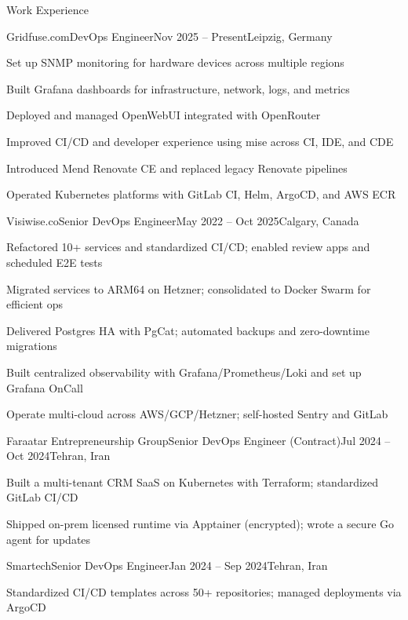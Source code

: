 \documentclass[]{main}
\begin{document}
\begin{section}{Work Experience}
  \begin{subsection}{Gridfuse.com}{DevOps Engineer}{Nov 2025 -- Present}{Leipzig, Germany}
     \item Set up SNMP monitoring for hardware devices across multiple regions
     \item Built Grafana dashboards for infrastructure, network, logs, and metrics
     \item Deployed and managed OpenWebUI integrated with OpenRouter
     \item Improved CI/CD and developer experience using mise across CI, IDE, and CDE
     \item Introduced Mend Renovate CE and replaced legacy Renovate pipelines
     \item Operated Kubernetes platforms with GitLab CI, Helm, ArgoCD, and AWS ECR
 \end{subsection}
 \begin{subsection}{Visiwise.co}{Senior DevOps Engineer}{May 2022 -- Oct 2025}{Calgary, Canada}
     \item Refactored 10+ services and standardized CI/CD; enabled review apps and scheduled E2E tests
     \item Migrated services to ARM64 on Hetzner; consolidated to Docker Swarm for efficient ops
     \item Delivered Postgres HA with PgCat; automated backups and zero-downtime migrations
     \item Built centralized observability with Grafana/Prometheus/Loki and set up Grafana OnCall
     \item Operate multi-cloud across AWS/GCP/Hetzner; self-hosted Sentry and GitLab
 \end{subsection}
 \begin{subsection}{Faraatar Entrepreneurship Group}{Senior DevOps Engineer (Contract)}{Jul 2024 -- Oct 2024}{Tehran, Iran}
     \item Built a multi-tenant CRM SaaS on Kubernetes with Terraform; standardized GitLab CI/CD
     \item Shipped on-prem licensed runtime via Apptainer (encrypted); wrote a secure Go agent for updates
 \end{subsection}
 \begin{subsection}{Smartech}{Senior DevOps Engineer}{Jan 2024 -- Sep 2024}{Tehran, Iran}
     \item Standardized CI/CD templates across 50+ repositories; managed deployments via ArgoCD

\end{subsection}
\end{section}
\end{document}
